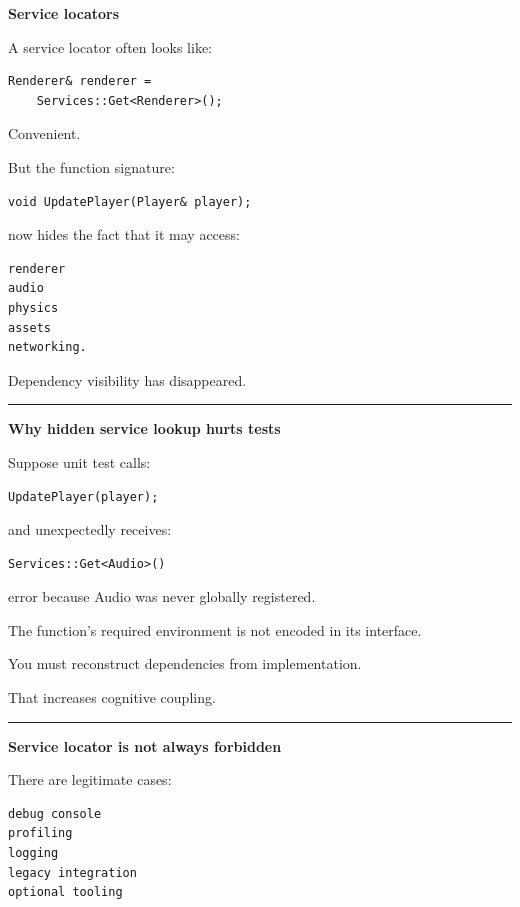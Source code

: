 \textbf{Service locators}

A service locator often looks like:

\begin{verbatim}
Renderer& renderer =
    Services::Get<Renderer>();
\end{verbatim}

Convenient.

But the function signature:

\begin{verbatim}
void UpdatePlayer(Player& player);
\end{verbatim}

now hides the fact that it may access:

\begin{verbatim}
renderer
audio
physics
assets
networking.
\end{verbatim}

Dependency visibility has disappeared.

\begin{center}\rule{0.5\linewidth}{0.5pt}\end{center}

\textbf{Why hidden service lookup hurts tests}

Suppose unit test calls:

\begin{verbatim}
UpdatePlayer(player);
\end{verbatim}

and unexpectedly receives:

\begin{verbatim}
Services::Get<Audio>()
\end{verbatim}

error because Audio was never globally registered.

The function's required environment is not encoded in its interface.

You must reconstruct dependencies from implementation.

That increases cognitive coupling.

\begin{center}\rule{0.5\linewidth}{0.5pt}\end{center}

\textbf{Service locator is not always forbidden}

There are legitimate cases:

\begin{verbatim}
debug console
profiling
logging
legacy integration
optional tooling
\end{verbatim}

